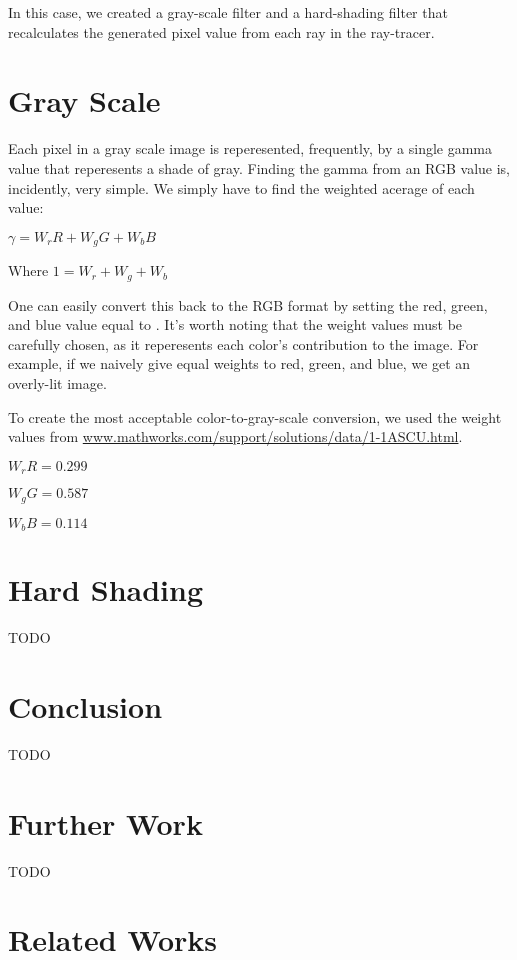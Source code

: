 \documentclass{acmsiggraph}
\begin{document}
In this case, we created a gray-scale filter and a hard-shading filter
that recalculates the generated pixel value from each ray in the ray-tracer.

\section*{Gray Scale}
Each pixel in a gray scale image is reperesented, frequently, by a single
gamma value that reperesents a shade of gray.  Finding the gamma from an
RGB value is, incidently, very simple.  We simply have to find the weighted
acerage of each value:

$\gamma = W_{r}R + W_{g}G + W_{b}B$

Where $1 = W_{r} + W_{g} + W_{b}$

One can easily convert this back to the RGB format by setting the red,
green, and blue value equal to \gamma.  It's worth noting that the weight
values must be carefully chosen, as it reperesents each color's contribution
to the image.  For example, if we naively give equal weights to red, green,
and blue, we get an overly-lit image.

To create the most acceptable color-to-gray-scale conversion, we used
the weight values from
\url{www.mathworks.com/support/solutions/data/1-1ASCU.html}.

$W_{r}R = 0.299$

$W_{g}G = 0.587$

$W_{b}B = 0.114$

\section*{Hard Shading}
TODO

\section{Conclusion}
TODO

\section{Further Work}
TODO

\section*{Related Works}
\end{document}
